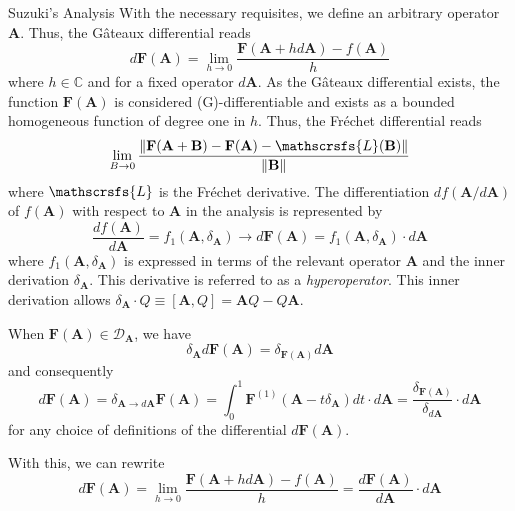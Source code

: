 \documentclass[aspectratio=169]{beamer}
\begin{document}
\begin{frame}[allowframebreaks]{Suzuki's Analysis}
		With the necessary requisites, we define an arbitrary operator $\textbf{A}$. Thus, the Gâteaux differential reads
		\begin{equation}
			d\textbf{F}(\textbf{A})=\lim_{h\to0}\frac{\textbf{F}(\textbf{A}+hd\textbf{A})-f(\textbf{A})}{h}
		\end{equation}
		where $h\in\mathbb{C}$ and for a fixed operator $d\textbf{A}$. As the Gâteaux differential exists, the function $\textbf{F}(\textbf{A})$ is considered (G)-differentiable and exists as a bounded homogeneous function of degree one in $h$. Thus, the Fréchet differential reads
		\begin{equation}
			\lim_{B\to0}\frac{\|\textbf{F}(\textbf{A}+\textbf{B})-\textbf{F}(\textbf{A})-\mathscrsfs{L}(\textbf{B})\|}{\|\textbf{B}\|}
		\end{equation}
		where $\mathscrsfs{L}$ is the Fréchet derivative. The differentiation $df(\textbf{A}/d\textbf{A})$ of $f(\textbf{A})$ with respect to $\textbf{A}$ in the analysis is represented by
		\begin{equation}
			\frac{df(\textbf{A})}{d\textbf{A}}=f_1(\textbf{A},\delta_{\textbf{A} })\to d\textbf{F}(\textbf{A})=f_1(\textbf{A},\delta_{\textbf{A}})\cdot d\textbf{A}
		\end{equation}
		where $f_1( \textbf{A},\delta_{\textbf{A}})$ is expressed in terms of the relevant operator $\textbf{A}$ and the inner derivation $\delta_{\textbf{A}}$. This derivative is referred to as a \textit{hyperoperator}. This inner derivation allows $\delta_{\textbf{A}}\cdot Q\equiv[\textbf{A},Q]=\textbf{A}Q-Q\textbf{A}$.
		\begin{theorem}
			When $\textbf{F}(\textbf{A})\in\mathcal{D}_{\textbf{A}}$, we have
			\begin{equation}
				\delta_{\textbf{A}}d\textbf{F}(\textbf{A})=\delta_{\textbf{F}(\textbf{A})}d\textbf{A}
			\end{equation}
			and consequently
			\begin{equation}
				d\textbf{F}(\textbf{A})=\delta_{\textbf{A}\to d\textbf{A}}\textbf{F}(\textbf{A})=\int_0^1\textbf{F}^{(1)}(\textbf{A}-t\delta_{\textbf{A}})dt\cdot d\textbf{A}=\frac{\delta_{\textbf{F}(\textbf{A})}}{\delta_{d\textbf{A}}}\cdot d\textbf{A}
			\end{equation}
			for any choice of definitions of the diﬀerential $d\textbf{F}(\textbf{A})$.
		\end{theorem}
		With this, we can rewrite
		\begin{equation}
			d\textbf{F}(\textbf{A})=\lim_{h\to0}\frac{\textbf{F}(\textbf{A}+hd\textbf{A})-f(\textbf{A})}{h}=\frac{d\textbf{F}(\textbf{A})}{d\textbf{A}}\cdot d\textbf{A}

\end{equation}
\end{frame}
\end{document}
